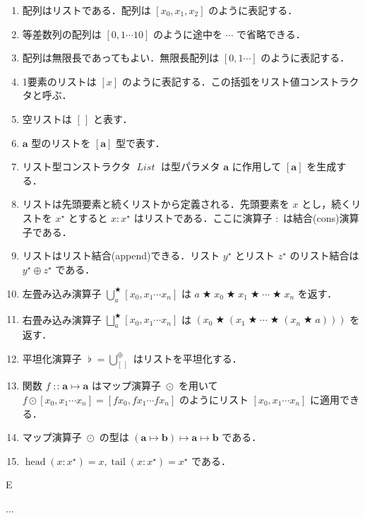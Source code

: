 \documentclass[a4paper,twocolumn]{jsbook}
\newenvironment{note}[1]{\begin{boxnote}\begin{center}#1\end{center}}{\end{boxnote}}
\newcommand{\mEmptyList}{{[\,]}}
\DeclareMathOperator{\mHead}{head}
\DeclareMathOperator{\mTail}{tail}
\DeclareMathOperator{\mAppend}{\oplus}
\DeclareMathOperator{\mBinOp}{\bigstar}
\DeclareMathOperator{\mConcat}{\flat}
\DeclareMathOperator*{\mFold}{\bigcup}
\DeclareMathOperator*{\mFoldRight}{\bigsqcup}
\DeclareMathOperator{\mIn}{{:\!:}}
\DeclareMathOperator{\mMapList}{\odot}
\DeclareMathOperator{\mMapsTo}{\mapsto}
\newcommand{\mType}[1]{\mathbf{#1}}
\newcommand{\mListWith}[1]{\left[#1\right]}
\newcommand{\mListType}[1]{\mListWith{\mType{#1}}}
\newcommand{\mTypeConstructor}[1]{\mathit{#1}} %
\DeclareMathOperator{\mListTypeConstructor}{\mTypeConstructor{List}}
\newcommand{\mList}[1]{{#1}^\mathrm{\star}}
\newcommand{\mProj}[2]{#1\mMapsTo#2}
\begin{document}
\begin{enumerate}
\item 配列はリストである．配列は $\mListWith{x_0,x_1,x_2}$ のように表記する．
\item 等差数列の配列は $\mListWith{0,1\dotsb10}$ のように途中を $\dotsb$ で省略できる．
\item 配列は無限長であってもよい．無限長配列は $\mListWith{0,1\dotsb}$ のように表記する．
\item 1要素のリストは $\mListWith{x}$ のように表記する．この括弧をリスト値コンストラクタと呼ぶ．
\item 空リストは $\mEmptyList$ と表す．
\item $\mType{a}$ 型のリストを $\mListType{a}$ 型で表す．
\item リスト型コンストラクタ $\mListTypeConstructor$ は型パラメタ $\mType{a}$ に作用して $\mListType{a}$ を生成する．
\item リストは先頭要素と続くリストから定義される．先頭要素を $x$ とし，続くリストを $\mList{x}$ とすると $x:\mList{x}$ はリストである．ここに演算子 $:$ は結合(cons)演算子である．
\item リストはリスト結合(append)できる．リスト $\mList{y}$ とリスト $\mList{z}$ のリスト結合は $\mList{y}\mAppend\mList{z}$ である．
\item 左畳み込み演算子 $\mFold^{\mBinOp}_a\mListWith{x_0,x_1\dotsb x_n}$ は $a\mBinOp x_0\mBinOp x_1\mBinOp\dotsb\mBinOp x_n$ を返す．
\item 右畳み込み演算子 $\mFoldRight^{\mBinOp}_{a}\mListWith{x_0,x_1\dotsb x_n}$ は
 $(x_0\mBinOp(x_1\mBinOp\dotsb\mBinOp(x_n\mBinOp a)))$ を返す．
\item 平坦化演算子 $\mConcat=\mFold_\mEmptyList^{\mAppend}$ はリストを平坦化する．
\item 関数 $f\mIn\mProj{\mType{a}}{\mType{a}}$ はマップ演算子 $\mMapList$ を用いて $f\mMapList\mListWith{x_0,x_1\dotsb x_n}=\mListWith{fx_0,fx_1\dotsb fx_n}$ のようにリスト $\mListWith{x_0,x_1\dotsb x_n}$ に適用できる．
\item マップ演算子 $\mMapList$ の型は $\mProj{(\mProj{\mType{a}}{\mType{b}})}{\mProj{\mType{a}}{\mType{b}}}$ である．
\item $\mHead(x:\mList{x})=x,\mTail(x:\mList{x})=\mList{x}$ である．
\end{enumerate}


\begin{note}{E}
...
\end{note}
\end{document}
